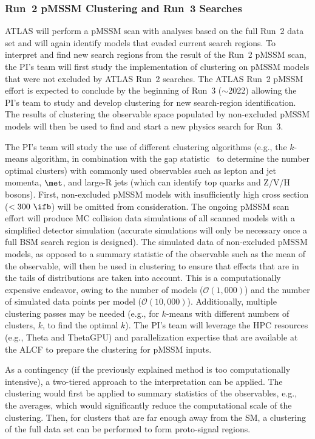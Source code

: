 \documentclass[letter, USenglish, 11pt, subfigure]{article}
\begin{document}
\subsubsection{Run~2 pMSSM Clustering and Run~3 Searches}

ATLAS will perform a pMSSM scan with analyses based on the full Run~2 data set and will again identify models that evaded current search regions. To interpret and find new search regions from the result of the Run~2 pMSSM scan, the PI's team will first study the implementation of clustering on pMSSM models that were not excluded by ATLAS Run~2 searches. The ATLAS Run~2 pMSSM effort is expected to conclude by the beginning of Run~3 ($\sim$2022) allowing the PI's team to study and develop clustering for new search-region identification. The results of clustering the observable space populated by non-excluded pMSSM models will then be used to find and start a new physics search for Run~3.

The PI's team will study the use of different clustering algorithms (e.g., the $k$-means algorithm, in combination with the gap statistic~\cite{Tibishirani} to determine the number optimal clusters) with commonly used observables such as lepton and jet momenta, $\met$, and large-R jets (which can identify top quarks and Z/V/H bosons). First, non-excluded pMSSM models with insufficiently high cross section ($<300~\ifb$) will be omitted from consideration. The ongoing pMSSM scan effort will produce MC collision data simulations of all scanned models with a simplified detector simulation (accurate simulations will only be necessary once a full BSM search region is designed). The simulated data of non-excluded pMSSM models, as opposed to a summary statistic of the observable such as the mean of the observable, will then be used in clustering to ensure that effects that are in the tails of distributions are taken into account. This is a computationally expensive endeavor, owing to the number of models ($\mathcal{O}(1,000)$) and the number of simulated data points per model ($\mathcal{O}(10,000)$). Additionally, multiple clustering passes may be needed (e.g., for $k$-means with different numbers of clusters, $k$, to find the optimal $k$). The PI's team will leverage the HPC resources (e.g., Theta and ThetaGPU) and parallelization expertise that are available at the ALCF to prepare the clustering for pMSSM inputs.

As a contingency (if the previously explained method is too computationally intensive), a two-tiered approach to the interpretation can be applied. The clustering would first be applied to summary statistics of the observables, e.g., the averages, which would significantly reduce the computational scale of the clustering. Then, for clusters that are far enough away from the SM, a clustering of the full data set can be performed to form proto-signal regions. 
\end{document}
